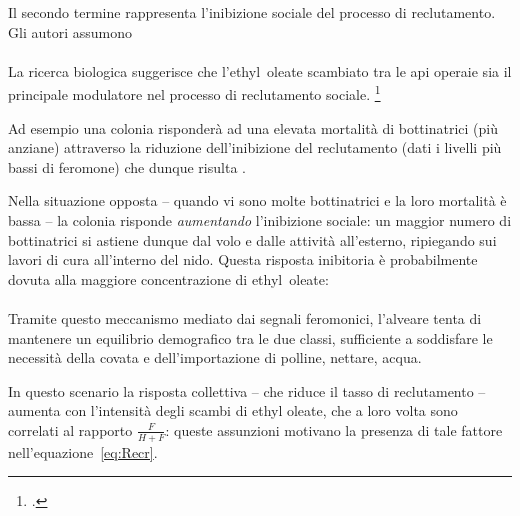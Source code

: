 Il secondo termine rappresenta l'inibizione sociale del processo di reclutamento.
Gli autori assumono

\paragraph{}
La ricerca biologica suggerisce che l'ethyl~oleate scambiato tra le api operaie sia
il principale modulatore nel processo di reclutamento sociale.
\footcite{ethyloleate,ethyloleate2,meccanica}

Ad esempio una colonia risponderà ad una elevata mortalità di bottinatrici (più anziane) attraverso
la riduzione dell'inibizione del reclutamento (dati i livelli più bassi di feromone) che dunque risulta
.

Nella situazione opposta -- \ie quando vi sono molte bottinatrici e la loro mortalità è bassa -- la colonia
risponde \emph{aumentando} l'inibizione sociale: un maggior numero di bottinatrici si astiene dunque dal volo e
dalle attività all'esterno, ripiegando sui lavori di cura all'interno del nido. Questa risposta inibitoria
è probabilmente dovuta alla maggiore concentrazione di ethyl~oleate:

\paragraph{}
Tramite questo meccanismo mediato dai segnali feromonici, l'alveare tenta di mantenere un equilibrio
demografico tra le due classi, sufficiente a soddisfare le necessità della covata e dell'importazione
di polline, nettare, acqua.

In questo scenario la risposta collettiva -- che riduce il tasso di reclutamento -- aumenta con
l'intensità degli scambi di ethyl oleate, che a loro volta sono correlati al rapporto $\frac{F}{H+F}$:
queste assunzioni motivano la presenza di tale fattore nell'equazione~\eqref{eq:Recr}.


